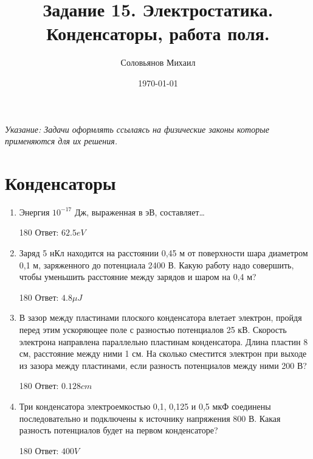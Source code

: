 \documentclass[a4paper,12pt]{article} %
\author{Соловьянов Михаил }
\title{Задание 15. Электростатика.  Конденсаторы, работа поля.}
\date{\today}
\begin{document}
\maketitle



\textit{Указание: Задачи оформлять ссылаясь на физические законы которые применяются для их решения.}




\section{ Конденсаторы }
\begin{enumerate}
	\item	Энергия $10^{-17} $ Дж, выраженная в эВ, составляет…
	\begin{turn}{180} 
	Ответ: $62.5 eV $ 
	\end{turn}


	\item	Заряд 5 нКл находится на расстоянии 0,45 м от поверхности шара диаметром 0,1 м, заряженного до потенциала 2400 В. Какую работу надо совершить, чтобы уменьшить расстояние между зарядов и шаром на 0,4 м?
	\begin{turn}{180} 
	Ответ: $4.8 \mu J  $
	\end{turn}

	\item В зазор между пластинами плоского конденсатора влетает электрон, пройдя перед этим ускоряющее поле с разностью потенциалов 25 кВ. Скорость электрона направлена параллельно пластинам конденсатора. Длина пластин 8 см, расстояние между ними 1 см. На сколько сместится электрон при выходе из зазора между пластинами, если разность потенциалов между ними 200 В?
	\begin{turn}{180} 
	Ответ: $0.128 cm  $
	\end{turn}


	\item Три конденсатора электроемкостью 0,1, 0,125 и 0,5 мкФ соединены последовательно и подключены к источнику напряжения 800 В. Какая разность потенциалов будет на первом конденсаторе?
	\begin{turn}{180} 
	Ответ: $ 400 V  $
	\end{turn}
	

\end{enumerate}
\end{document}
